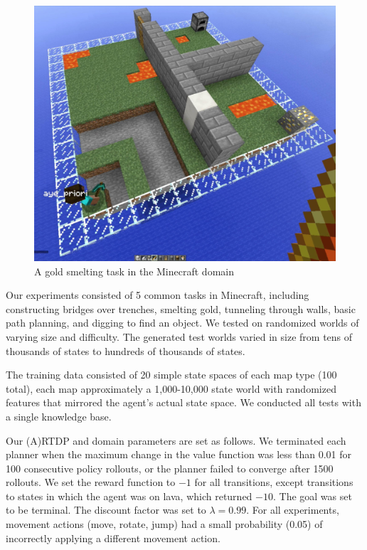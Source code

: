 \documentclass[conference]{IEEEtran}
\newcommand{\dnote}[1]{\textcolor{Green}{\textbf{}}}
\begin{document}
\dnote{We still need to stick in a note about the VI results, and the fact that affordances can be plugged into
other MDP/OO-MDP solvers}

\begin{figure}[t]
\centering
\includegraphics[scale=0.13]{figures/epicworld_1.jpg}%
  \caption{A gold smelting task in the Minecraft domain}
  \label{fig:minecraft}
\end{figure}

Our experiments consisted of 5 common tasks in Minecraft, including
constructing bridges over trenches, smelting gold, tunneling
through walls, basic path planning, and digging to find an object.  We tested on 
randomized worlds of varying size and difficulty. The generated test
worlds varied in size from tens of thousands of states to hundreds of thousands of states.

The training data consisted of 20 simple state spaces of each map type
(100 total), each map approximately a 1,000-10,000 state world with
randomized features that mirrored the agent's actual state space. We conducted all tests
with a single knowledge base.

Our (A)RTDP and domain parameters are set as follows. We terminated each planner
when the maximum change in the value function was less than 0.01 for
100 consecutive policy rollouts, or the planner failed to converge
after 1500 rollouts.  We set the reward function to $-1$ for all
transitions, except transitions to states in which the agent was on
lava, which returned $-10$. The goal was set to be terminal. The
discount factor was set to $\lambda = 0.99$. For all experiments,
movement actions (move, rotate, jump) had a small probability (0.05)
of incorrectly applying a different movement action.
\end{document}
